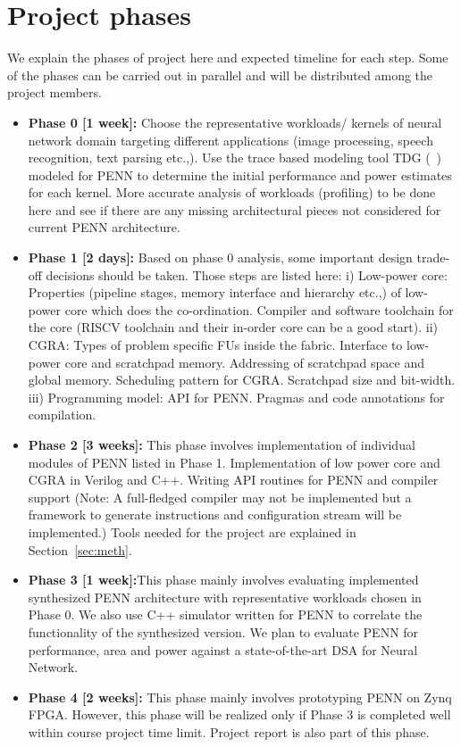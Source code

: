 \section{Project phases}\label{sec:plan}

We explain the phases of project here and expected timeline for 
each step. Some of the phases can be carried out in parallel and will be distributed 
among the project members.

\begin{itemize}
\item \textbf{Phase 0 [1 week]:} Choose the representative workloads/ kernels of neural network domain
targeting different applications (image processing, speech recognition, text parsing etc.,). 
Use the trace based modeling tool TDG (~\cite{tonytdg}) modeled
for PENN to determine the initial performance and power estimates for each kernel.
More accurate analysis of workloads (profiling) to be done here and see if there are any missing architectural
pieces not considered for current PENN architecture.

\item \textbf{Phase 1 [2 days]:} Based on phase 0 analysis, some important design trade-off decisions should be taken. Those steps are listed here:
i) Low-power core: Properties (pipeline stages, memory interface and hierarchy etc.,) of low-power core which does the co-ordination.
Compiler and software toolchain for the core (RISCV toolchain and their in-order core can be a good start). 
ii) CGRA: Types of problem specific FUs inside the fabric.  Interface to low-power core and scratchpad memory.
Addressing of scratchpad space and global memory. Scheduling pattern for CGRA. Scratchpad size and bit-width.
iii) Programming model: API for PENN. Pragmas and code annotations for compilation.

\item \textbf{Phase 2 [3 weeks]:} This phase involves implementation of individual modules of PENN listed in Phase 1. 
Implementation of low power core and CGRA in Verilog and C++.
Writing API routines for PENN and compiler support (Note: A full-fledged compiler may not be implemented but 
a framework to generate instructions and configuration stream will be implemented.)
Tools needed for the project are explained in Section~\ref{sec:meth}.

\item \textbf{Phase 3 [1 week]:}This phase mainly involves evaluating implemented synthesized PENN architecture with
    representative workloads chosen in Phase 0. We also use C++ simulator written for PENN to correlate the functionality of the synthesized version. 
We plan to evaluate PENN for performance, area and power against a state-of-the-art DSA for Neural Network.

\item \textbf{Phase 4 [2 weeks]:} This phase mainly involves prototyping PENN on Zynq FPGA. However, this phase will be realized only if Phase 3 is
    completed well within course project time limit. Project report is also part of this phase.
\end{itemize}




